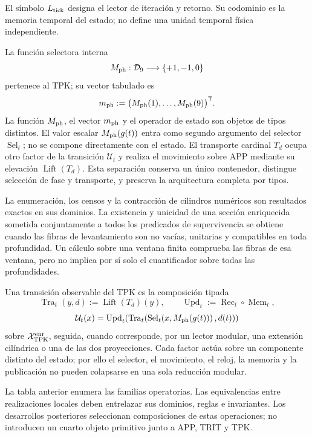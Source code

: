 El símbolo \(L_{\rm tick}\) designa el lector de iteración y retorno. Su
codominio es la memoria temporal del estado; no define una unidad temporal
física independiente.

La función selectora interna
\[
 M_{\rm ph}:\mathcal D_9\longrightarrow\{+1,-1,0\}
\]
pertenece al TPK\@; su vector tabulado es
\[
 m_{\rm ph}:=\bigl(M_{\rm ph}(1),\ldots,M_{\rm ph}(9)\bigr)^{\mathsf T}.
\]
La función \(M_{\rm ph}\), el vector \(m_{\rm ph}\) y el operador de estado
son objetos de tipos distintos. El valor escalar \(M_{\rm ph}(g(t))\) entra
como segundo argumento del selector \(\operatorname{Sel}_t\); no se compone
directamente con el estado. El transporte cardinal \(T_d\) ocupa otro factor
de la transición \(\mathcal U_t\) y realiza el movimiento sobre APP mediante
su elevación \(\operatorname{Lift}(T_d)\). Esta separación conserva un único
contenedor, distingue selección de fase y transporte, y preserva la
arquitectura completa por tipos.

\begin{resultbox}[title={Profundidad finita y límite enriquecido}]
La enumeración, los censos y la contracción de cilindros numéricos son
resultados exactos en sus dominios. La existencia y unicidad de una sección
enriquecida sometida conjuntamente a todos los predicados de supervivencia
se obtiene cuando las fibras de levantamiento son no vacías, unitarias y
compatibles en toda profundidad. Un cálculo sobre una ventana finita
comprueba las fibras de esa ventana, pero no implica por sí solo el
cuantificador sobre todas las profundidades.
\end{resultbox}

\begin{theorem}
\label{thm:composicion-dinamica-tpk-rev11}
Una transición observable del TPK es la composición tipada
\[
 \operatorname{Tra}_t(y,d):=\operatorname{Lift}(T_d)(y),
 \qquad
 \operatorname{Upd}_t:=\operatorname{Rec}_t\circ\operatorname{Mem}_t,
\]
\[
 \mathcal U_t(x)
 =\operatorname{Upd}_t\!\left(
  \operatorname{Tra}_t\!\left(
   \operatorname{Sel}_t\!\left(x,M_{\rm ph}(g(t))\right),d(t)
  \right)\right)
\]
sobre \(\mathcal X_{\rm TPK}^{\rm enr}\), seguida, cuando corresponde, por
un lector modular, una extensión cilíndrica o una de las dos proyecciones.
Cada factor actúa sobre un componente distinto del estado; por ello el
selector, el movimiento, el reloj, la memoria y la publicación no pueden
colapsarse en una sola reducción modular.
\end{theorem}

La tabla anterior enumera las familias operatorias. Las equivalencias entre
realizaciones locales deben entrelazar sus dominios, reglas e invariantes.
Los desarrollos posteriores seleccionan composiciones de estas operaciones;
no introducen un cuarto objeto primitivo junto a APP, TRIT y TPK.
